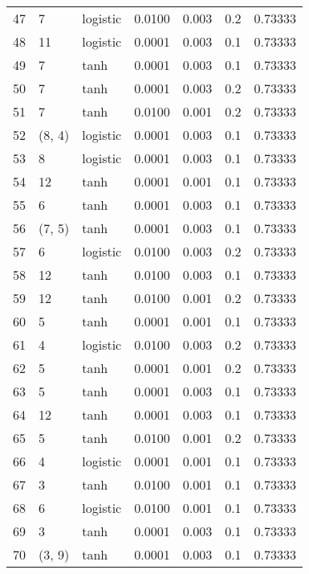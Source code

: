 \begin{tabular}{lllrrrr}
47  &           7 &  logistic &  0.0100 &  0.003 &  0.2 &   0.73333 \\
48  &          11 &  logistic &  0.0001 &  0.003 &  0.1 &   0.73333 \\
49  &           7 &      tanh &  0.0001 &  0.003 &  0.1 &   0.73333 \\
50  &           7 &      tanh &  0.0001 &  0.003 &  0.2 &   0.73333 \\
51  &           7 &      tanh &  0.0100 &  0.001 &  0.2 &   0.73333 \\
52  &      (8, 4) &  logistic &  0.0001 &  0.003 &  0.1 &   0.73333 \\
53  &           8 &  logistic &  0.0001 &  0.003 &  0.1 &   0.73333 \\
54  &          12 &      tanh &  0.0001 &  0.001 &  0.1 &   0.73333 \\
55  &           6 &      tanh &  0.0001 &  0.003 &  0.1 &   0.73333 \\
56  &      (7, 5) &      tanh &  0.0001 &  0.003 &  0.1 &   0.73333 \\
57  &           6 &  logistic &  0.0100 &  0.003 &  0.2 &   0.73333 \\
58  &          12 &      tanh &  0.0100 &  0.003 &  0.1 &   0.73333 \\
59  &          12 &      tanh &  0.0100 &  0.001 &  0.2 &   0.73333 \\
60  &           5 &      tanh &  0.0001 &  0.001 &  0.1 &   0.73333 \\
61  &           4 &  logistic &  0.0100 &  0.003 &  0.2 &   0.73333 \\
62  &           5 &      tanh &  0.0001 &  0.001 &  0.2 &   0.73333 \\
63  &           5 &      tanh &  0.0001 &  0.003 &  0.1 &   0.73333 \\
64  &          12 &      tanh &  0.0001 &  0.003 &  0.1 &   0.73333 \\
65  &           5 &      tanh &  0.0100 &  0.001 &  0.2 &   0.73333 \\
66  &           4 &  logistic &  0.0001 &  0.001 &  0.1 &   0.73333 \\
67  &           3 &      tanh &  0.0100 &  0.001 &  0.1 &   0.73333 \\
68  &           6 &  logistic &  0.0100 &  0.001 &  0.1 &   0.73333 \\
69  &           3 &      tanh &  0.0001 &  0.003 &  0.1 &   0.73333 \\
70  &      (3, 9) &      tanh &  0.0001 &  0.003 &  0.1 &   0.73333 \\

\end{tabular}
